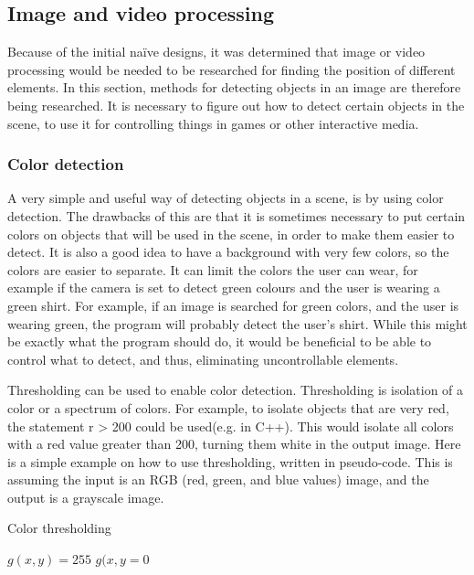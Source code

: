 \subsection{Image and video processing}
Because of the initial naïve designs, it was determined that image or video processing would be needed to be researched for finding the position of different elements. In this section, methods for detecting objects in an image are therefore being researched. It is necessary to figure out how to detect certain objects in the scene, to use it for controlling things in games or other interactive media.

\subsubsection{Color detection}
A very simple and useful way of detecting objects in a scene, is by using color detection. The drawbacks of this are that it is sometimes necessary to put certain colors on objects that will be used in the scene, in order to make them easier to detect. It is also a good idea to have a background with very few colors, so the colors are easier to separate. It can limit the colors the user can wear, for example if the camera is set to detect green colours and the user is wearing a green shirt. For example, if an image is searched for green colors, and the user is wearing green, the program will probably detect the user's shirt. While this might be exactly what the program should do, it would be beneficial to be able to control what to detect, and thus, eliminating uncontrollable elements.

Thresholding can be used to enable color detection. Thresholding is isolation of a color or a spectrum of colors. For example, to isolate objects that are very red, the statement r > 200 could be used(e.g. in C++). This would isolate all colors with a red value greater than 200, turning them white in the output image. Here is a simple example on how to use thresholding, written in pseudo-code. This is assuming the input is an RGB (red, green, and blue values) image, and the output is a grayscale image.

\begin{algorithm}[H]
\caption{Color thresholding}
\label{code:threshold}
\begin{algorithmic}
\STATE $g(x,y)=255$
\ELSE
\STATE $g(x,y = 0$
\ENDIF
\end{algorithmic}
\end{algorithm}

